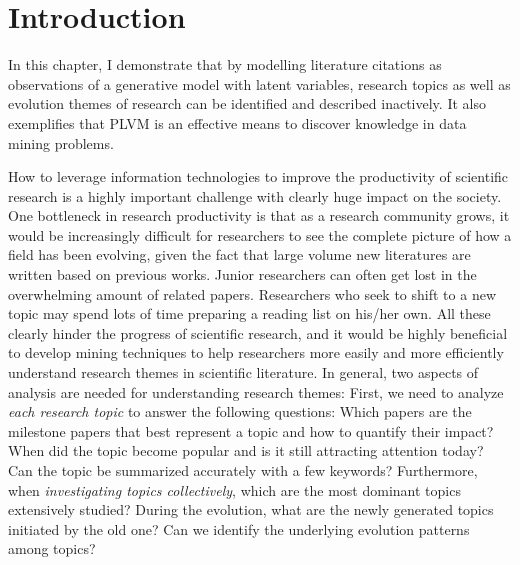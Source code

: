 \section{Introduction}

In this chapter, I demonstrate that by modelling literature citations as
observations of a generative model with latent variables, research topics as
well as evolution themes of research can be identified and described inactively.
It also exemplifies that PLVM is an effective means to discover knowledge in
data mining problems.

How to leverage information technologies to improve the  productivity of
scientific research is a highly important challenge with clearly huge impact on
the society. One bottleneck in research productivity is that as a research
community grows, it would be increasingly difficult for researchers to see the
complete picture of how a field has been evolving, given the fact that large
volume new literatures are written based on previous works. Junior researchers
can often get lost in the overwhelming amount of related papers. Researchers who
seek to shift to a new topic may spend lots of time preparing a reading list on
his/her own. All these clearly hinder the progress of scientific research, and
it would be highly beneficial to develop mining techniques to help researchers
more easily and more efficiently  understand research themes in scientific
literature.  In general, two aspects of analysis are needed for understanding
research themes: First, we need to analyze \emph{each research topic} to answer
the following questions: Which papers are the milestone papers that best
represent a topic and how to quantify their impact?  When did the topic become
popular and is it still attracting attention today?  Can the topic be summarized
accurately with a few keywords?  Furthermore, when \emph{investigating topics
collectively}, which are the most dominant topics extensively studied?  During
the evolution, what are the newly generated topics initiated by the old one?
Can we identify the underlying evolution patterns among topics?

